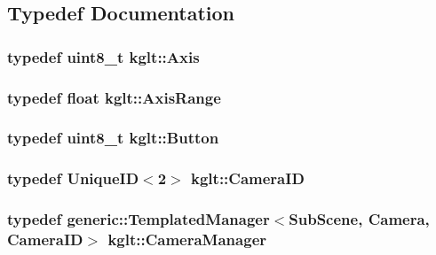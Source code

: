 \subsection{Typedef Documentation}
\hypertarget{namespacekglt_aacdc540f5eb3041498aaff3012a9a9ec}{
\subsubsection[{Axis}]{\setlength{\rightskip}{0pt plus 5cm}typedef uint8\-\_\-t {\bf kglt\-::\-Axis}}}\label{namespacekglt_aacdc540f5eb3041498aaff3012a9a9ec}
\hypertarget{namespacekglt_a191e1834d9739a151c5083c08fce8938}{
\subsubsection[{Axis\-Range}]{\setlength{\rightskip}{0pt plus 5cm}typedef float {\bf kglt\-::\-Axis\-Range}}}\label{namespacekglt_a191e1834d9739a151c5083c08fce8938}
\hypertarget{namespacekglt_a3a2475e3cbfe8d5c5bf855448b8a91dd}{
\subsubsection[{Button}]{\setlength{\rightskip}{0pt plus 5cm}typedef uint8\-\_\-t {\bf kglt\-::\-Button}}}\label{namespacekglt_a3a2475e3cbfe8d5c5bf855448b8a91dd}
\hypertarget{namespacekglt_a2a2b79f136b052b58ec737bd9c885429}{
\subsubsection[{Camera\-I\-D}]{\setlength{\rightskip}{0pt plus 5cm}typedef {\bf Unique\-I\-D}$<$2$>$ {\bf kglt\-::\-Camera\-I\-D}}}\label{namespacekglt_a2a2b79f136b052b58ec737bd9c885429}
\hypertarget{namespacekglt_a62f4cbff006c7d1239f2c357cff9e3fd}{
\subsubsection[{Camera\-Manager}]{\setlength{\rightskip}{0pt plus 5cm}typedef {\bf generic\-::\-Templated\-Manager}$<${\bf Sub\-Scene}, {\bf Camera}, {\bf Camera\-I\-D}$>$ {\bf kglt\-::\-Camera\-Manager}}}\label{namespacekglt_a62f4cbff006c7d1239f2c357cff9e3fd}
